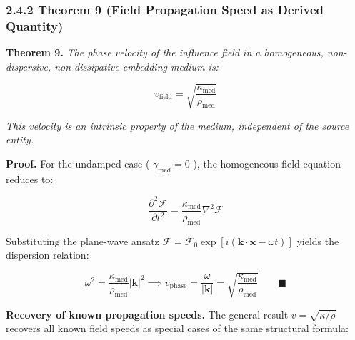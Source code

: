 \documentclass[11pt,a4paper]{article}
\theoremstyle{definition}\newtheorem{definition}{Definition}
\theoremstyle{remark}\newtheorem{remark}{Remark}
\begin{document}
\subsubsection{2.4.2 Theorem 9 (Field Propagation Speed as Derived Quantity)}

\textbf{Theorem 9.} \textit{The phase velocity of the influence field in a homogeneous, non-dispersive, non-dissipative embedding medium is:}


\begin{equation}
\boxed{v_{\text{field}} = \sqrt{\frac{\kappa_{\text{med}}}{\rho_{\text{med}}}}}
\end{equation}


\textit{This velocity is an intrinsic property of the medium, independent of the source entity.}

\textbf{Proof.} For the undamped case ( $\gamma_{\text{med}} = 0$ ), the homogeneous field equation reduces to:


\begin{equation}
\frac{\partial^2 \mathcal{F}}{\partial t^2} = \frac{\kappa_{\text{med}}}{\rho_{\text{med}}} \nabla^2 \mathcal{F}
\end{equation}


Substituting the plane-wave ansatz $\mathcal{F} = \mathcal{F}_0 \exp[i(\mathbf{k} \cdot \mathbf{x} - \omega t)]$ yields the dispersion relation:


\begin{equation}
\omega^2 = \frac{\kappa_{\text{med}}}{\rho_{\text{med}}} |\mathbf{k}|^2 \implies v_{\text{phase}} = \frac{\omega}{|\mathbf{k}|} = \sqrt{\frac{\kappa_{\text{med}}}{\rho_{\text{med}}}} \qquad \blacksquare
\end{equation}


\textbf{Recovery of known propagation speeds.} The general result $v = \sqrt{\kappa/\rho}$ recovers all known field speeds as special cases of the same structural formula:
\end{document}
